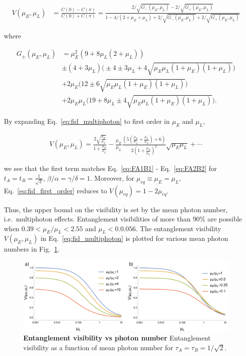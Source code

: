 \documentclass[11pt]{caltech_thesis} %
\begin{document}
\hypertarget{eq:fid_multiphoton}{}{
\begin{align}
    V(\mu_E, \mu_L) &= \frac{C(0)-C(\pi)}{C(0)+C(\pi)}=\frac{2/\sqrt{G_{-}(\mu_E, \mu_L)}-2/\sqrt{G_{+}(\mu_E, \mu_L)}}{1-4/(2+\mu_E+\mu_L)+2/\sqrt{G_{-}(\mu_E, \mu_L)}+2/\sqrt{G_{+}(\mu_E, \mu_L)}}\label{eq:fid_multiphoton}
\end{align}
}

where

\begin{align}
     G_{\pm}(\mu_E, \mu_L)&=\mu_E^2(9+8\mu_L(2+\mu_L))\\
     &\pm(4+3\mu_L)\bigg(\pm4\pm3\mu_L+4\sqrt{\mu_E \mu_L (1+\mu_E)(1+\mu_L)}\bigg)\nonumber\\     &+2\mu_E\bigg(12\pm6\sqrt{\mu_E\mu_L(1+\mu_E)(1+\mu_L)}\bigg)\nonumber\\
     &+2\mu_E\mu_L\Big(19+8\mu_L \pm 4\sqrt{\mu_E\mu_L (1+\mu_E)(1+\mu_L)}\Big). \nonumber
 \end{align}

By expanding Eq.~\ref{eq:fid_multiphoton} to first order in $\mu_E$ and $\mu_L$,

\hypertarget{eq:fid_first_order}{}{
\begin{align}
    V(\mu_E,\mu_L) = \frac{2\sqrt{\frac{\mu_E}{\mu_L}}}{1+\frac{\mu_E}{\mu_L}} - \frac{\mu_E}{\mu_L}\frac{\left(5(\frac{\mu_E}{\mu_L}+\frac{\mu_L}{\mu_E})+6\right)}{2(1+\frac{\mu_E}{\mu_L})^2}\sqrt{\mu_E\mu_L}+\cdots\label{eq: fid_first_order}
\end{align}
}

we see that the first term matches Eq.~\ref{eq:FA1B1} - Eq.~\ref{eq:FA2B2} for $t_A = t_B = \frac{1}{\sqrt{2}}$, $\beta/\alpha = \gamma/\delta = 1$. Moreover, for $\mu_{eq} \equiv \mu_E = \mu_L$, Eq.~\ref{eq:fid_first_order} reduces to $V(\mu_{eq}) = 1 - 2\mu_{eq}$.

Thus, the upper bound on the visibility is set by the mean photon number, i.e.~multiphoton effects. Entanglement visibilities of more than 90\% are possible when $0.39 < \mu_E/\mu_L < 2.55$ and $\mu_L < 0.0.056$. The entanglement visibility $V(\mu_E, \mu_L)$ in Eq.~\ref{eq:fid_multiphoton} is plotted for various mean photon numbers in Fig.~\ref{fig:fid_multiphoton}.

\hypertarget{fig:fid_multiphoton}{%
\begin{figure}
\centering
\includegraphics[width=1\textwidth,height=\textheight]{./chapter_09/figs/Fid_vs_mu_above_below.png}
\caption[{Entanglement visibility vs photon number}]{\textbf{Entanglement visibility vs photon number} Entanglement visibility as a function of mean photon number for $\tau_A = \tau_B = 1/\sqrt{2}$.}
\label{fig:fid_multiphoton}
\end{figure}
}

\printbibliography
\end{document}
